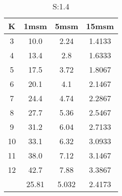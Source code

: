 \begin{table}[H]
\centering
\begin{tabular}{c|ccc}
K &1msm &5msm &15msm\\
\hline
3 & 10.0 & 2.24 & 1.4133\\
4 & 13.4 & 2.8 & 1.6333\\
5 & 17.5 & 3.72 & 1.8067\\
6 & 20.1 & 4.1 & 2.1467\\
7 & 24.4 & 4.74 & 2.2867\\
8 & 27.7 & 5.36 & 2.5467\\
9 & 31.2 & 6.04 & 2.7133\\
10 & 33.1 & 6.32 & 3.0933\\
11 & 38.0 & 7.12 & 3.1467\\
12 & 42.7 & 7.88 & 3.3867\\
\hline
& 25.81 & 5.032 & 2.4173\\
\end{tabular}
\caption{S:1.4}
\label{tab:s1.4}
\end{table}
